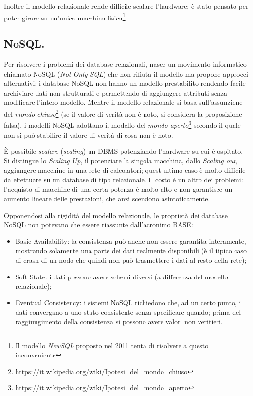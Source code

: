 \documentclass[a4page, 11pt]{article}
\begin{document}
Inoltre il modello relazionale rende difficile scalare l'hardware: è stato pensato per poter girare su un'unica macchina fisica\footnote{Il modello \textit{NewSQL} proposto nel 2011 tenta di risolvere a questo inconveniente}.


\subsection{NoSQL.}
Per risolvere i problemi dei database relazionali, nasce un movimento informatico chiamato NoSQL (\textit{Not Only SQL}) che non rifiuta il modello ma propone approcci alternativi: i database NoSQL non hanno un modello prestabilito rendendo facile archiviare dati non strutturati e permettendo di aggiungere attributi senza modificare l'intero modello.
Mentre il modello relazionale si basa sull'assunzione del \textit{mondo chiuso}\footnote{\url{https://it.wikipedia.org/wiki/Ipotesi_del_mondo_chiuso}} (se il valore di verità non è noto, si considera la proposizione falsa), i modelli NoSQL adottano il modello del \textit{mondo aperto}\footnote{\url{https://it.wikipedia.org/wiki/Ipotesi_del_mondo_aperto}} secondo il quale non si può stabilire il valore di verità di cosa non è noto.

È possibile \textit{scalare} (\textit{scaling}) un DBMS potenziando l'hardware su cui è ospitato. Si distingue lo \textit{Scaling Up}, il potenziare la singola macchina, dallo \textit{Scaling out}, aggiungere macchine in una rete di calcolatori; quest ultimo caso è molto difficile da effettuare su un database di tipo relazionale. Il costo è un altro dei problemi: l'acquisto di macchine di una certa potenza è molto alto e non garantisce un aumento lineare delle prestazioni, che anzi scendono asintoticamente.

Opponendosi alla rigidità del modello relazionale, le proprietà dei database NoSQL non potevano che essere riassunte dall'acronimo BASE:
\begin{itemize}
\item Basic Availability: la consistenza può anche non essere garantita interamente, mostrando solamente una parte dei dati realmente disponibili (è il tipico caso di crash di un nodo che quindi non può trasmettere i dati al resto della rete);
\item Soft State: i dati possono avere schemi diversi (a differenza del modello relazionale);
\item Eventual Consistency: i sistemi NoSQL richiedono che, ad un certo punto, i dati convergano a uno stato consistente senza specificare quando; prima del raggiungimento della consistenza si possono avere valori non veritieri.
\end{itemize}
\end{document}
